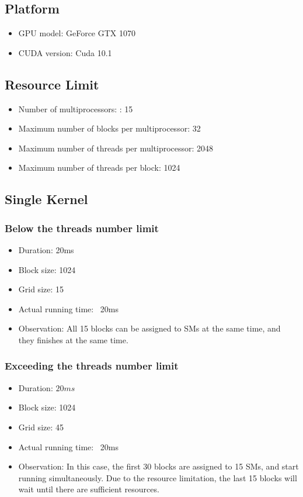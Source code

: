 \documentclass[12pt,journal,compsoc]{IEEEtran}
\begin{document}
\subsection{Platform}
\begin{itemize}
   \item GPU model: GeForce GTX 1070 
   \item CUDA version: Cuda 10.1
\end{itemize}

\subsection{Resource Limit}
\begin{itemize}
   \item Number of multiprocessors: : 15
   \item Maximum number of blocks per multiprocessor: 32
   \item Maximum number of threads per multiprocessor: 2048
   \item Maximum number of threads per block: 1024
\end{itemize}

\subsection{Single Kernel}
\subsubsection{Below the threads number limit}
\begin{itemize}
   \item Duration: 20ms
   \item Block size: 1024
   \item Grid size: 15
   \item Actual running time: ~20ms
   \item Observation: All 15 blocks can be assigned to SMs at the same time, and they finishes at the same time.
\end{itemize}
\subsubsection{Exceeding the threads number limit}
\begin{itemize}
   \item Duration: $20ms$
   \item Block size: 1024
   \item Grid size: 45
   \item Actual running time: ~20ms
   \item Observation: In this case, the first 30 blocks are assigned to 15 SMs, and start running simultaneously. Due to the resource limitation, the last 15 blocks will wait until there are sufficient resources.
\end{itemize}
\end{document}
